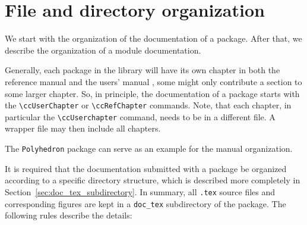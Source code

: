 \section{File and directory organization\label{sec:files_required}}

We start with the organization of the documentation of a package.
After that, we describe the organization of a module documentation.

Generally, each package in the library will have its own chapter in
both the reference manual and the users' manual%
%
, some might only contribute a
section to some larger chapter. So, in principle, the documentation of
a package starts with the \verb|\ccUserChapter| or \verb|\ccRefChapter|
commands. Note, that each chapter, in particular the \verb|\ccUserchapter|
command, needs to be in a different file. A wrapper file may then include
all chapters.

The \texttt{Polyhedron} package can serve as an example for the manual
organization.

It is required that the documentation submitted with a package be organized
according to a specific directory structure, which is described more
completely in Section~\ref{sec:doc_tex_subdirectory}. In summary, all
{\tt .tex} source files and corresponding figures are kept in a
\texttt{doc\_tex} subdirectory of the package. The following rules
describe the details:

